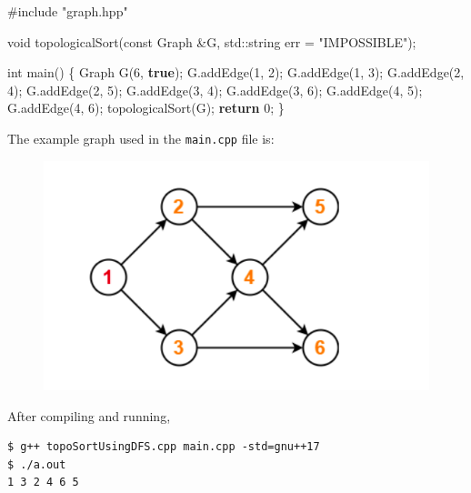 \documentclass[
]{article}
\newenvironment{Shaded}{}{}
\newcommand{\AttributeTok}[1]{\textcolor[rgb]{0.49,0.56,0.16}{#1}}
\newcommand{\BuiltInTok}[1]{#1}
\newcommand{\ControlFlowTok}[1]{\textcolor[rgb]{0.00,0.44,0.13}{\textbf{#1}}}
\newcommand{\DataTypeTok}[1]{\textcolor[rgb]{0.56,0.13,0.00}{#1}}
\newcommand{\DecValTok}[1]{\textcolor[rgb]{0.25,0.63,0.44}{#1}}
\newcommand{\ImportTok}[1]{#1}
\newcommand{\KeywordTok}[1]{\textcolor[rgb]{0.00,0.44,0.13}{\textbf{#1}}}
\newcommand{\NormalTok}[1]{#1}
\newcommand{\PreprocessorTok}[1]{\textcolor[rgb]{0.74,0.48,0.00}{#1}}
\newcommand{\StringTok}[1]{\textcolor[rgb]{0.25,0.44,0.63}{#1}}
\begin{document}
\begin{Shaded}
\begin{Highlighting}[]
\PreprocessorTok{\#include }\ImportTok{"graph.hpp"}

\DataTypeTok{void}\NormalTok{ topologicalSort(}\AttributeTok{const}\NormalTok{ Graph \&G, }\BuiltInTok{std::}\NormalTok{string err = }\StringTok{"IMPOSSIBLE"}\NormalTok{);}

\DataTypeTok{int}\NormalTok{ main() \{}
\NormalTok{    Graph G(}\DecValTok{6}\NormalTok{, }\KeywordTok{true}\NormalTok{);}
\NormalTok{    G.addEdge(}\DecValTok{1}\NormalTok{, }\DecValTok{2}\NormalTok{);}
\NormalTok{    G.addEdge(}\DecValTok{1}\NormalTok{, }\DecValTok{3}\NormalTok{);}
\NormalTok{    G.addEdge(}\DecValTok{2}\NormalTok{, }\DecValTok{4}\NormalTok{);}
\NormalTok{    G.addEdge(}\DecValTok{2}\NormalTok{, }\DecValTok{5}\NormalTok{);}
\NormalTok{    G.addEdge(}\DecValTok{3}\NormalTok{, }\DecValTok{4}\NormalTok{);}
\NormalTok{    G.addEdge(}\DecValTok{3}\NormalTok{, }\DecValTok{6}\NormalTok{);}
\NormalTok{    G.addEdge(}\DecValTok{4}\NormalTok{, }\DecValTok{5}\NormalTok{);}
\NormalTok{    G.addEdge(}\DecValTok{4}\NormalTok{, }\DecValTok{6}\NormalTok{);}
\NormalTok{    topologicalSort(G);}
    \ControlFlowTok{return} \DecValTok{0}\NormalTok{;}
\NormalTok{\}}
\end{Highlighting}
\end{Shaded}

The example graph used in the \texttt{main.cpp} file is:

\begin{figure}
\centering
\includegraphics{../mds/eg.png}
\caption{}
\end{figure}

After compiling and running,

\begin{verbatim}
$ g++ topoSortUsingDFS.cpp main.cpp -std=gnu++17 
$ ./a.out
1 3 2 4 6 5 
\end{verbatim}
\end{document}
